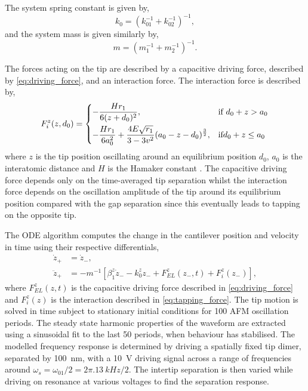 \documentclass{article}
\begin{document}
The system spring constant is given by,
\begin{equation}
	k_0 = \left( k_{01}^{-1} + k_{02}^{-1} \right)^{-1},
\end{equation}
and the system mass is given similarly by,
\begin{equation}
	m = \left( m_1^{-1} + m_2^{-1} \right)^{-1}.
\end{equation}

The forces acting on the tip are described by a capacitive driving force, described by \eqref{eq:driving_force}, and an interaction force. The interaction force is described by,
\begin{equation}
	F_i^z(z, d_0) =
	\begin{dcases}
	-\frac{H r_1}{6(z+d_0)^2}, & \text{if } d_0 + z > a_0 \\
	-\frac{H r_1}{6a_0^2} + \frac{4E\sqrt{r_1}}{3 - 3v^2} (a_0-z-d_0)^{\frac{3}{2}}, & \text{if} d_0 + z \leq a_0
	\end{dcases}
	\label{eq:tapping_force}
\end{equation}
where $z$ is the tip position oscillating around an equilibrium position $d_0$, $a_0$ is the interatomic distance and $H$ is the Hamaker constant \cite{tamayo1996deformation, garcia1999attractive, san2002unifying, lee2002nonlinear}. The capacitive driving force depends only on the time-averaged tip separation whilst the interaction force depends on the oscillation amplitude of the tip around its equilibrium position compared with the gap separation since this eventually leads to tapping on the opposite tip.

The ODE algorithm computes the change in the cantilever position and velocity in time using their respective differentials,
\begin{align}
	\dot{z}_+ &= \dot{z}_-, \\
	\ddot{z}_+ &= -m^{-1}\left[\beta_1^z\dot{z}_- - k_0^zz_- + F_{EL}^z(z_-, t) + F_i^z(z_-)\right],
\end{align}
where $F_{EL}^z(z,t)$ is the capacitive driving force described in \eqref{eq:driving_force} and $F_i^z(z)$ is the interaction described in \eqref{eq:tapping_force}. The tip motion is solved in time subject to stationary initial conditions for 100 AFM oscillation periods. The steady state harmonic properties of the waveform are extracted using a sinusoidal fit to the last 50 periods, when behaviour has stabilised.
The modelled frequency response is determined by driving a spatially fixed tip dimer, separated by \SI{100}{nm}, with a \SI{10}{V} driving signal across a range of frequencies around $\omega_s = \omega_{01}/2 = 2\pi.\SI{13}{kHz}/2$. The intertip separation is then varied while driving on resonance at various voltages to find the separation response.
\end{document}
